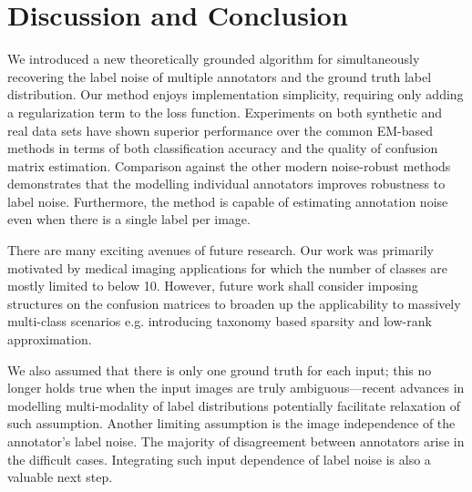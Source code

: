 

\section{Discussion and Conclusion}

We introduced a new theoretically grounded algorithm for simultaneously recovering the label noise of multiple annotators and the ground truth label distribution. Our method enjoys implementation simplicity, requiring only adding a regularization term to the loss function. Experiments on both synthetic and real data sets have shown superior performance over the common EM-based methods in terms of both classification accuracy and the quality of confusion matrix estimation. Comparison against the other modern noise-robust methods demonstrates that the modelling individual annotators improves robustness to label noise. Furthermore, the method is capable of estimating annotation noise even when there is a single label per image. 

There are many exciting avenues of future research. Our work was primarily motivated by medical imaging applications for which the number of classes are mostly limited to below 10. However, future work shall consider imposing structures on the confusion matrices to broaden up the applicability to massively multi-class scenarios e.g. introducing taxonomy based sparsity \cite{van2018lean} and low-rank approximation. 

We also assumed that there is only one ground truth for each input; this no longer holds true when the input images are truly ambiguous---recent advances in modelling multi-modality of label distributions \cite{saeedi2017multimodal,kohl2018probabilistic} potentially facilitate relaxation of such assumption. Another limiting assumption is the image independence of the annotator's label noise. The majority of disagreement between annotators arise in the difficult cases. Integrating such input dependence of label noise \cite{yan2010modeling,xiao2015learning} is also a valuable next step.

